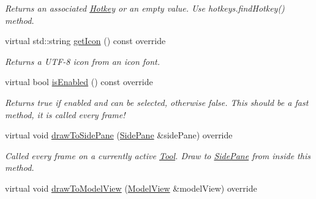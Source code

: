 \begin{DoxyCompactItemize}
\begin{DoxyCompactList}\small\item\em Returns an associated \mbox{\hyperlink{structpepr3d_1_1_hotkey}{Hotkey}} or an empty value. Use hotkeys.\+find\+Hotkey() method. \end{DoxyCompactList}\item 
\mbox{\label{classpepr3d_1_1_paint_bucket_a81f945468a9ddcca09bd3bd1fa4e156c}} 
virtual std\+::string \mbox{\hyperlink{classpepr3d_1_1_paint_bucket_a81f945468a9ddcca09bd3bd1fa4e156c}{get\+Icon}} () const override
\begin{DoxyCompactList}\small\item\em Returns a U\+T\+F-\/8 icon from an icon font. \end{DoxyCompactList}\item 
\mbox{\label{classpepr3d_1_1_paint_bucket_a493abf6741118fc98fefa50adc266a6d}} 
virtual bool \mbox{\hyperlink{classpepr3d_1_1_paint_bucket_a493abf6741118fc98fefa50adc266a6d}{is\+Enabled}} () const override
\begin{DoxyCompactList}\small\item\em Returns true if enabled and can be selected, otherwise false. This should be a fast method, it is called every frame! \end{DoxyCompactList}\item 
\mbox{\label{classpepr3d_1_1_paint_bucket_a1e4d61353e4c1a2bf4e911690cc45e64}} 
virtual void \mbox{\hyperlink{classpepr3d_1_1_paint_bucket_a1e4d61353e4c1a2bf4e911690cc45e64}{draw\+To\+Side\+Pane}} (\mbox{\hyperlink{classpepr3d_1_1_side_pane}{Side\+Pane}} \&side\+Pane) override
\begin{DoxyCompactList}\small\item\em Called every frame on a currently active \mbox{\hyperlink{classpepr3d_1_1_tool}{Tool}}. Draw to \mbox{\hyperlink{classpepr3d_1_1_side_pane}{Side\+Pane}} from inside this method. \end{DoxyCompactList}\item 
\mbox{\label{classpepr3d_1_1_paint_bucket_a166b6b6bd0caef117635aec4489cce66}} 
virtual void \mbox{\hyperlink{classpepr3d_1_1_paint_bucket_a166b6b6bd0caef117635aec4489cce66}{draw\+To\+Model\+View}} (\mbox{\hyperlink{classpepr3d_1_1_model_view}{Model\+View}} \&model\+View) override

\end{DoxyCompactItemize}
